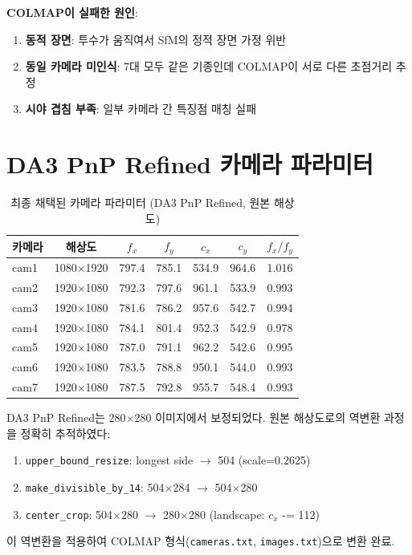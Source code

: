 \documentclass[11pt, a4paper]{report}
\begin{document}
\begin{warningbox}
\textbf{COLMAP이 실패한 원인}:
\begin{enumerate}[nosep]
  \item \textbf{동적 장면}: 투수가 움직여서 SfM의 정적 장면 가정 위반
  \item \textbf{동일 카메라 미인식}: 7대 모두 같은 기종인데 COLMAP이 서로 다른 초점거리 추정
  \item \textbf{시야 겹침 부족}: 일부 카메라 간 특징점 매칭 실패
\end{enumerate}
\end{warningbox}

\section{DA3 PnP Refined 카메라 파라미터}

\begin{table}[H]
\centering
\caption{최종 채택된 카메라 파라미터 (DA3 PnP Refined, 원본 해상도)}
\renewcommand{\arraystretch}{1.3}
\small
\begin{tabular}{lcccccc}
\toprule
\textbf{카메라} & \textbf{해상도} & \textbf{$f_x$} & \textbf{$f_y$} & \textbf{$c_x$} & \textbf{$c_y$} & \textbf{$f_x/f_y$} \\
\midrule
cam1 & 1080$\times$1920 & 797.4 & 785.1 & 534.9 & 964.6 & 1.016 \\
cam2 & 1920$\times$1080 & 792.3 & 797.6 & 961.1 & 533.9 & 0.993 \\
cam3 & 1920$\times$1080 & 781.6 & 786.2 & 957.6 & 542.7 & 0.994 \\
cam4 & 1920$\times$1080 & 784.1 & 801.4 & 952.3 & 542.9 & 0.978 \\
cam5 & 1920$\times$1080 & 787.0 & 791.1 & 962.2 & 542.6 & 0.995 \\
cam6 & 1920$\times$1080 & 783.5 & 788.8 & 950.1 & 544.0 & 0.993 \\
cam7 & 1920$\times$1080 & 787.5 & 792.8 & 955.7 & 548.4 & 0.993 \\
\bottomrule
\end{tabular}
\end{table}

\begin{keyidea}
DA3 PnP Refined는 280$\times$280 이미지에서 보정되었다.
원본 해상도로의 역변환 과정을 정확히 추적하였다:
\begin{enumerate}[nosep]
  \item \texttt{upper\_bound\_resize}: longest side $\rightarrow$ 504 (scale=0.2625)
  \item \texttt{make\_divisible\_by\_14}: 504$\times$284 $\rightarrow$ 504$\times$280
  \item \texttt{center\_crop}: 504$\times$280 $\rightarrow$ 280$\times$280 (landscape: $c_x$ -= 112)
\end{enumerate}
이 역변환을 적용하여 COLMAP 형식(\texttt{cameras.txt}, \texttt{images.txt})으로 변환 완료.
\end{keyidea}
\end{document}
